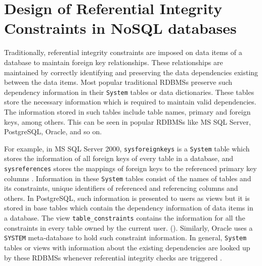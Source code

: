\chapter{Design of Referential Integrity Constraints in NoSQL
databases} \label{c:solutions}

Traditionally,  referential
integrity constraints are imposed on data items of a database to maintain
foreign key relationships.   These relationships are
 maintained by correctly identifying and preserving the data dependencies 
 existing between the data items.  
Most popular traditional \acp{RDBMS}
preserve such dependency information in their \texttt{System} tables or data
dictionaries.    These tables store the necessary information  which is required
to maintain valid dependencies.   The information stored in such tables include table
names,   primary and foreign keys, among others.  
This can be seen in popular \acp{RDBMS} like  MS SQL Server,   PostgreSQL, 
Oracle,  and so on.    

For example,   in MS SQL Server 2000,  \texttt{sysforeignkeys}
is a \texttt{System} table which stores the information of all 
foreign keys of every table in a database,  and \texttt{sysreferences}
stores the mappings of  foreign keys to the referenced primary key columns
\citep{sys:msdn}.  
Information in these \texttt{System} tables consist of  the
names of tables and its constraints,   unique identifiers of 
referenced and referencing columns and others.   
In PostgreSQL,  such information is presented to users as views but it is stored
in base tables which contain the dependency information of data items in a database. 
The view \texttt{table\_constraints} contains the information for all the
constraints in every table owned by the current user.   (\todo{\cite{}}).   
Similarly,  Oracle uses a \texttt{SYSTEM} meta-database to hold such constraint
information.  
 In general,  \texttt{System} tables or views with information
about the existing dependencies  are looked up by these \acp{RDBMS} whenever
referential integrity checks are triggered \citep{sys:msdn}.  


